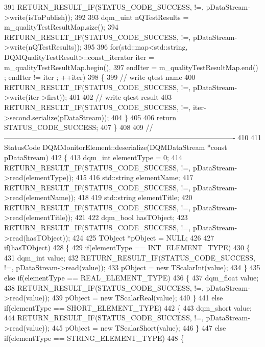 \begin{DoxyCode}
391   RETURN_RESULT_IF(STATUS\_CODE\_SUCCESS, !=, pDataStream->write(isToPublish));
392 
393   dqm_uint nQTestResults = m\_qualityTestResultMap.size();
394   RETURN_RESULT_IF(STATUS\_CODE\_SUCCESS, !=, pDataStream->write(nQTestResults));
395 
396   \textcolor{keywordflow}{for}(std::map<std::string, DQMQualityTestResult>::const\_iterator iter = m\_qualityTestResultMap.begin(),
397       endIter = m\_qualityTestResultMap.end() ; endIter != iter ; ++iter)
398   \{
399     \textcolor{comment}{// write qtest name}
400     RETURN_RESULT_IF(STATUS\_CODE\_SUCCESS, !=, pDataStream->write(iter->first));
401 
402     \textcolor{comment}{// write qtest result}
403     RETURN_RESULT_IF(STATUS\_CODE\_SUCCESS, !=, iter->second.serialize(pDataStream));
404   \}
405 
406   \textcolor{keywordflow}{return} STATUS\_CODE\_SUCCESS;
407 \}
408 
409 \textcolor{comment}{//-------------------------------------------------------------------------------------------------}
410 
411 StatusCode DQMMonitorElement::deserialize(DQMDataStream *\textcolor{keyword}{const} pDataStream)
412 \{
413   dqm_int elementType = 0;
414   RETURN_RESULT_IF(STATUS\_CODE\_SUCCESS, !=, pDataStream->read(elementType));
415 
416   std::string elementName;
417   RETURN_RESULT_IF(STATUS\_CODE\_SUCCESS, !=, pDataStream->read(elementName));
418 
419   std::string elementTitle;
420   RETURN_RESULT_IF(STATUS\_CODE\_SUCCESS, !=, pDataStream->read(elementTitle));
421 
422   dqm_bool hasTObject;
423   RETURN_RESULT_IF(STATUS\_CODE\_SUCCESS, !=, pDataStream->read(hasTObject));
424 
425   TObject *pObject = NULL;
426 
427   \textcolor{keywordflow}{if}(hasTObject)
428   \{
429     \textcolor{keywordflow}{if}(elementType == INT\_ELEMENT\_TYPE)
430     \{
431       dqm_int value;
432       RETURN_RESULT_IF(STATUS\_CODE\_SUCCESS, !=, pDataStream->read(value));
433       pObject = \textcolor{keyword}{new} TScalarInt(value);
434     \}
435     \textcolor{keywordflow}{else} \textcolor{keywordflow}{if}(elementType == REAL\_ELEMENT\_TYPE)
436     \{
437       dqm_float value;
438       RETURN_RESULT_IF(STATUS\_CODE\_SUCCESS, !=, pDataStream->read(value));
439       pObject = \textcolor{keyword}{new} TScalarReal(value);
440     \}
441     \textcolor{keywordflow}{else} \textcolor{keywordflow}{if}(elementType == SHORT\_ELEMENT\_TYPE)
442     \{
443       dqm_short value;
444       RETURN_RESULT_IF(STATUS\_CODE\_SUCCESS, !=, pDataStream->read(value));
445       pObject = \textcolor{keyword}{new} TScalarShort(value);
446     \}
447     \textcolor{keywordflow}{else} \textcolor{keywordflow}{if}(elementType == STRING\_ELEMENT\_TYPE)
448     \{

\end{DoxyCode}
